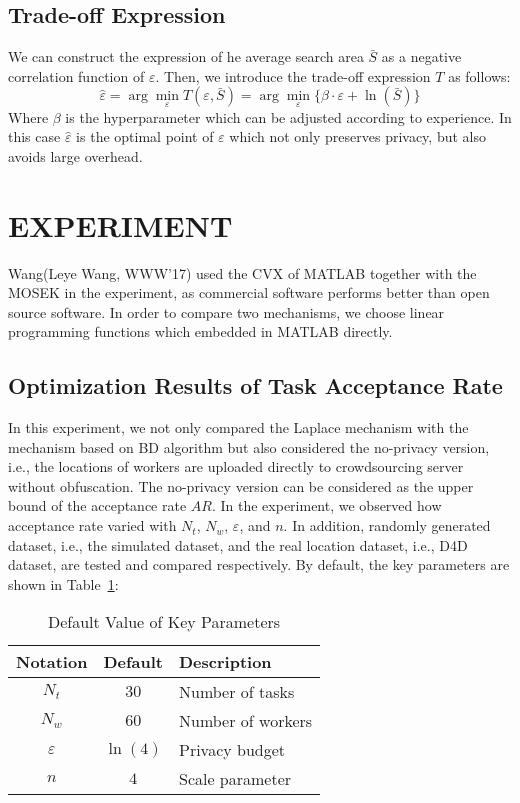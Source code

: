 \subsection{Trade-off Expression} %
We can construct the expression of he average search area $\bar{S}$ as a negative correlation function of $\varepsilon$. Then, we introduce the trade-off expression $T$ as follows:
$$
	\hat{\varepsilon}=\arg \min_\varepsilon T(\varepsilon , \bar{S})=\arg \min_\varepsilon \{ \beta \cdot \varepsilon + \ln (\bar{S}) \}
$$
Where $\beta$ is the hyperparameter which can be adjusted according to experience. In this case $\hat{\varepsilon}$ is the optimal point of $\varepsilon$ which not only preserves privacy, but also avoids large overhead.

\section{EXPERIMENT} %
Wang(Leye Wang, WWW’17) used the CVX of MATLAB together with the MOSEK in the experiment, as commercial software performs better than open source software. In order to compare two mechanisms, we choose linear programming functions which embedded in MATLAB directly.

\subsection{Optimization Results of Task Acceptance Rate} %
In this experiment, we not only compared the Laplace mechanism with the mechanism based on BD algorithm but also considered the no-privacy version, i.e., the locations of workers are uploaded directly to crowdsourcing server without obfuscation. The no-privacy version can be considered as the upper bound of the acceptance rate $AR$. In the experiment, we observed how acceptance rate varied with $N_t$, $N_w$, $\varepsilon$, and $n$. In addition, randomly generated dataset, i.e., the simulated dataset, and the real location dataset, i.e., D4D dataset, are tested and compared respectively. By default, the key parameters are shown in Table~\ref{tab:deft}:
\begin{table}
  \caption{Default Value of Key Parameters}
  \label{tab:deft}
  \begin{tabular}{ccl}
    \toprule
    Notation & Default & Description\\
    \midrule
    $N_t$ & $30$ & Number of tasks\\
    $N_w$ & $60$ & Number of workers\\
    $\varepsilon$ & $\ln (4)$ & Privacy budget\\
    $n$ & $4$ & Scale parameter\\
  \bottomrule
\end{tabular}
\end{table}

